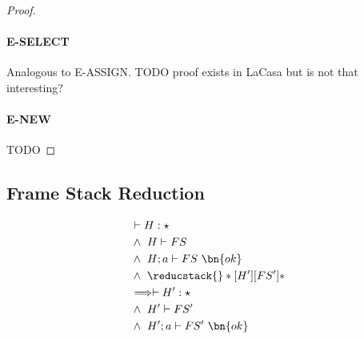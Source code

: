 \begin{proof}
\paragraph{E-SELECT}
Analogous to E-ASSIGN.
TODO proof exists in LaCasa but is not that interesting?

\paragraph{E-NEW}
TODO

\end{proof}

\subsection{Frame Stack Reduction}
\begin{theorem}
    \begin{alignat}{3}
    & \vdash H : \star\\
    &\wedge\ H \vdash FS\\
    &\wedge\ H; a \vdash FS\ \bn{ok}\\
    &\wedge\ \reducstack{}*[H']{}[FS']*\\
    &\Longrightarrow \vdash H' : \star\\
    &\wedge\ H' \vdash FS'\\
    &\wedge\ H'; a \vdash FS'\ \bn{ok}
    \end{alignat}
\end{theorem}
